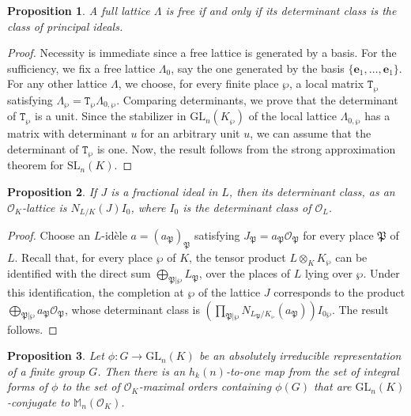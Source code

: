 \documentclass{article}
\newtheorem{prop}{Proposition}[section]
\theoremstyle{definition}
\begin{document}
\begin{prop}\label{p52}
    A full lattice $\Lambda$ is free if and only if 
    its determinant class is the class of principal ideals.
\end{prop}

\begin{proof}
    Necessity is immediate since a free lattice is 
    generated by a basis. For the sufficiency, we fix
    a free lattice $\Lambda_0$, say the one generated by the basis $\{\mathbf{e}_1,\dots,\mathbf{e}_1\}$.
    For any other lattice $\Lambda$, we choose, for
    every finite place $\wp$, a local matrix 
    $\mathtt{T}_\wp$ satisfying $\Lambda_\wp=
    \mathtt{T}_\wp\Lambda_{0,\wp}$. Comparing determinants, 
    we prove that the determinant of
    $\mathtt{T}_\wp$ is a unit. Since
    the stabilizer in $\mathrm{GL}_n(K_\wp)$
    of the local lattice $\Lambda_{0,\wp}$ has a
    matrix with determinant $u$ for an arbitrary 
    unit $u$, we can assume that the determinant of
    $\mathtt{T}_\wp$ is one. Now, the result follows 
    from the strong approximation theorem for 
    $\mathrm{SL}_n(K)$.
\end{proof}


\begin{prop}\label{p53}
    If $J$ is a fractional ideal in $L$, then its
    determinant class, as an $\mathcal{O}_K$-lattice
    is $N_{L/K}(J)I_0$, where $I_0$ is the determinant class
    of $\mathcal{O}_L$.
\end{prop}

\begin{proof}
Choose an $L$-id\`ele $a=(a_\mathfrak{P})_\mathfrak{P}$ satisfying 
$J_\mathfrak{P}=a_\mathfrak{P}\mathcal{O}_\mathfrak{P}$ for every place
$\mathfrak{P}$ of $L$. Recall that, for every place $\wp$ of $K$,
the tensor product $L\otimes_{K}K_\wp$ can be identified with the direct
sum $\bigoplus_{\mathfrak{P}|\wp}L_\mathfrak{P}$, over the places of
$L$ lying over $\wp$. Under this identification, the completion at
$\wp$ of the lattice $J$ corresponds to the product
$\bigoplus_{\mathfrak{P}|\wp}a_\mathfrak{P}\mathcal{O}_\mathfrak{P}$,
whose determinant class is $\left(\prod_{\mathfrak{P}|\wp}
N_{L_\mathfrak{P}/K_\wp}(a_\mathfrak{P})\right)I_{0\wp}$.
The result follows.
\end{proof}

\begin{prop}\label{p44}
    Let $\phi:G\rightarrow\mathrm{GL}_n(K)$ be an absolutely irreducible 
    representation of a finite group $G$. Then there is an $h_k(n)$-to-one
    map from the set of integral forms of $\phi$ to the set of
    $\mathcal{O}_K$-maximal orders containing $\phi(G)$ that are 
    $\mathrm{GL}_n(K)$-conjugate to $\mathbb{M}_n(\mathcal{O}_K)$.
\end{prop}
\end{document}
